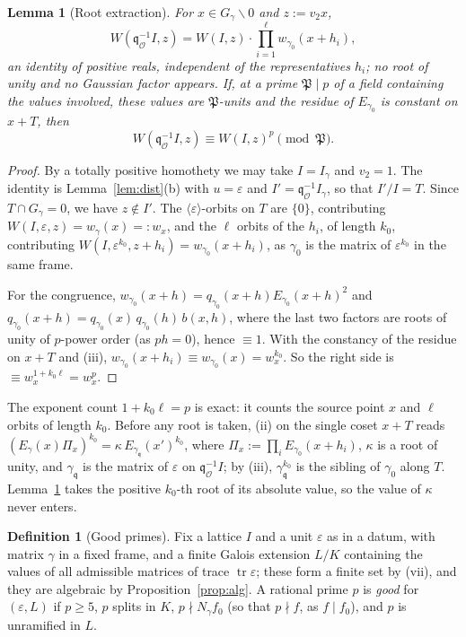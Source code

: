 \documentclass[11pt]{amsart}
\numberwithin{equation}{section}
\theoremstyle{plain}
\newtheorem{lemma}[theorem]{Lemma}
\theoremstyle{definition}
\newtheorem{definition}[theorem]{Definition}
\theoremstyle{remark}
\begin{document}
\begin{lemma}[Root extraction]\label{lem:root}
For \(x\in G_\gamma\smallsetminus0\) and \(z:=v_2x\),
\[W(\mathfrak q_{\mathcal O}^{-1}I,z)=W(I,z)\cdot\prod_{i=1}^{\ell}w_{\gamma_0}(x+h_i),\]
an identity of positive reals, independent of the representatives \(h_i\); no root of unity and no Gaussian factor appears. If, at a prime \(\mathfrak P\mid p\) of a field containing the values involved, these values are \(\mathfrak P\)-units and the residue of \(E_{\gamma_0}\) is constant on \(x+T\), then
\[W(\mathfrak q_{\mathcal O}^{-1}I,z)\equiv W(I,z)^p\pmod{\mathfrak P}.\]
\end{lemma}

\begin{proof}
By a totally positive homothety we may take \(I=I_\gamma\) and \(v_2=1\). The identity is Lemma~\ref{lem:dist}(b) with \(u=\varepsilon\) and \(I'=\mathfrak q_{\mathcal O}^{-1}I_\gamma\), so that \(I'/I=T\). Since \(T\cap G_\gamma=0\), we have \(z\notin I'\). The \(\langle\varepsilon\rangle\)-orbits on \(T\) are \(\{0\}\), contributing \(W(I,\varepsilon,z)=w_\gamma(x)=:w_x\), and the \(\ell\) orbits of the \(h_i\), of length \(k_0\), contributing \(W(I,\varepsilon^{k_0},z+h_i)=w_{\gamma_0}(x+h_i)\), as \(\gamma_0\) is the matrix of \(\varepsilon^{k_0}\) in the same frame.

For the congruence, \(w_{\gamma_0}(x+h)=q_{\gamma_0}(x+h)E_{\gamma_0}(x+h)^2\) and \(q_{\gamma_0}(x+h)=q_{\gamma_0}(x)\,q_{\gamma_0}(h)\,b(x,h)\), where the last two factors are roots of unity of \(p\)-power order (as \(ph=0\)), hence \(\equiv1\). With the constancy of the residue on \(x+T\) and (iii), \(w_{\gamma_0}(x+h_i)\equiv w_{\gamma_0}(x)=w_x^{k_0}\). So the right side is \(\equiv w_x^{1+k_0\ell}=w_x^{p}\).
\end{proof}

The exponent count \(1+k_0\ell=p\) is exact: it counts the source point \(x\) and \(\ell\) orbits of length \(k_0\). Before any root is taken, (ii) on the single coset \(x+T\) reads \((E_\gamma(x)\Pi_x)^{k_0}=\kappa\,E_{\gamma_{\mathfrak q}}(x')^{k_0}\), where \(\Pi_x:=\prod_iE_{\gamma_0}(x+h_i)\), \(\kappa\) is a root of unity, and \(\gamma_{\mathfrak q}\) is the matrix of \(\varepsilon\) on \(\mathfrak q_{\mathcal O}^{-1}I\); by (iii), \(\gamma_{\mathfrak q}^{k_0}\) is the sibling of \(\gamma_0\) along \(T\). Lemma~\ref{lem:root} takes the positive \(k_0\)-th root of its absolute value, so the value of \(\kappa\) never enters.

\begin{definition}[Good primes]\label{def:good}
Fix a lattice \(I\) and a unit \(\varepsilon\) as in a datum, with matrix \(\gamma\) in a fixed frame, and a finite Galois extension \(L/K\) containing the values of all admissible matrices of trace \(\operatorname{tr}\varepsilon\); these form a finite set by (vii), and they are algebraic by Proposition~\ref{prop:alg}. A rational prime \(p\) is \emph{good} for \((\varepsilon,L)\) if \(p\ge5\), \(p\) splits in \(K\), \(p\nmid N_\gamma f_0\) (so that \(p\nmid f\), as \(f\mid f_0\)), and \(p\) is unramified in \(L\).
\end{definition}
\end{document}
